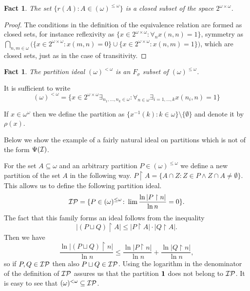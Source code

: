 \documentclass[12pt]{article}
\theoremstyle{plain}
\newtheorem{fact}[theorem]{Fact}
\theoremstyle{definition}
\theoremstyle{remark}
\newcommand{\cI}{{\cal I}}
\newcommand{\cP}{{\cal P}}
\newcommand{\Part}{(\omega)^{\leq\omega}}
\newcommand{\FinPart}{(\omega)^{<\omega}}
\begin{document}
\begin{fact}
The set $\{r(A)\colon A\in\Part\}$ is a closed subset of the space $2^{\omega\times\omega}$.
\end{fact}

\begin{proof}
The conditions in the definition of the equivalence relation are formed as closed sets, for instance reflexivity as $\{x\in 2^{\omega\times\omega} \colon \forall_{n} x(n, n) = 1\}$, symmetry as 
$\bigcap_{n,m\in\omega} \big(\{x\in 2^{\omega\times\omega}\colon 
x(m,n) = 0 \} \cup \{x\in 2^{\omega\times\omega} 
\colon x(n,m) = 1\}\big)$, which are closed sets, just as in the case of transitivity.
\end{proof}

\begin{fact}
The partition ideal $\FinPart$ is an $F_{\sigma}$ subset of $\Part$.
\end{fact}
\proof
It is sufficient to write
\[\FinPart = \{
x\in 2^{\omega\times\omega}
\exists_{n_1,\ldots,n_k\in\omega}\colon
\forall_{n\in\omega} \exists_{i=1,\ldots,k}
x(n_i,n) = 1
\}\]

If $x \in \omega^\omega$ then we define the partition as
$\{ x^{-1}(k)\colon k\in\omega \} \setminus \{\emptyset\}$ and denote it by $\rho(x)$.

Below we show the example of a fairly natural ideal on partitions which is not of the form $\Psi(\cI)$.

For the set $A \subseteq \omega$ and an arbitrary partition $P\in\Part$ we define a new partition of the set $A$ in the following way.
$P\restriction A = \{A \cap Z\colon
Z \in P \wedge Z\cap A \not=\emptyset\}$.
This allows us to define the following partition ideal.
$$\cI\cP = \{P \in \Part\colon \lim \frac{\ln |P \restriction n|}{\ln n} = 0\}.$$
The fact that this family forms an ideal follows from the inequality
$$|(P \sqcup Q) \restriction A| \leq |P \restriction A| \cdot |Q \restriction A|.$$
Then we have 
$$\frac{\ln |(P \sqcup Q) \restriction n|}{\ln n} \leq \frac{\ln |P \restriction n|}{\ln n} + \frac{\ln |Q \restriction n|}{\ln n},$$
so if $P,Q\in\cI\cP$ then also $P \sqcup Q\in\cI\cP$.
Using the logarithm in the denominator of the definition of $\cI\cP$ assures us that the partition ${\bf 1}$ does not belong to $\cI\cP$.
It is easy to see that $\FinPart\subseteq \cI\cP$. 
\end{document}
